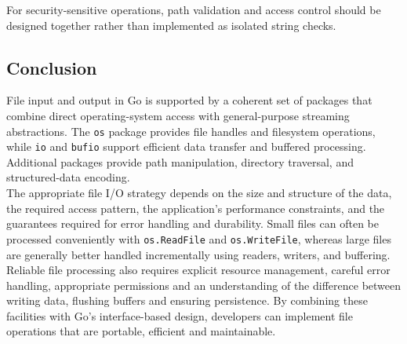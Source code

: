 For security-sensitive operations, path validation and access control should be designed together rather than implemented as isolated string checks.\\

\subsection{Conclusion}

File input and output in Go is supported by a coherent set of packages that combine direct operating-system access with general-purpose streaming abstractions. The \texttt{os} package provides file handles and filesystem operations, while \texttt{io} and \texttt{bufio} support efficient data transfer and buffered processing. Additional packages provide path manipulation, directory traversal, and structured-data encoding.\\

The appropriate file I/O strategy depends on the size and structure of the data, the required access pattern, the application's performance constraints, and the guarantees required for error handling and durability. Small files can often be processed conveniently with \texttt{os.ReadFile} and \texttt{os.WriteFile}, whereas large files are generally better handled incrementally using readers, writers, and buffering.\\

Reliable file processing also requires explicit resource management, careful error handling, appropriate permissions and an understanding of the difference between writing data, flushing buffers and ensuring persistence. By combining these facilities with Go's interface-based design, developers can implement file operations that are portable, efficient and maintainable.